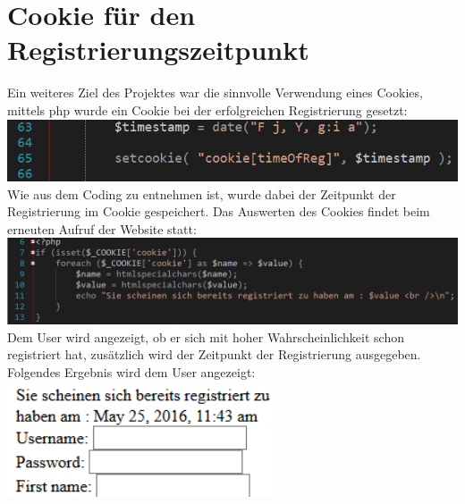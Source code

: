 \chapter{Cookie für den Registrierungszeitpunkt}
Ein weiteres Ziel des Projektes war die sinnvolle Verwendung eines Cookies, mittels php wurde ein Cookie bei der erfolgreichen Registrierung gesetzt:
\newline
\includegraphics[width=1\textwidth]{img/vincent/abb18.png}
\newline
Wie aus dem Coding zu entnehmen ist, wurde dabei der Zeitpunkt der Registrierung im Cookie gespeichert. Das Auswerten des Cookies findet beim erneuten Aufruf der Website statt:
\newline
\includegraphics[width=1\textwidth]{img/vincent/abb19.png}
\newline
Dem User wird angezeigt, ob er sich mit hoher Wahrscheinlichkeit schon registriert hat, zus\"atzlich wird der Zeitpunkt der Registrierung ausgegeben. Folgendes Ergebnis wird dem User angezeigt:
\newline
\includegraphics[width=0.6\textwidth]{img/vincent/abb20.png}
\newline

